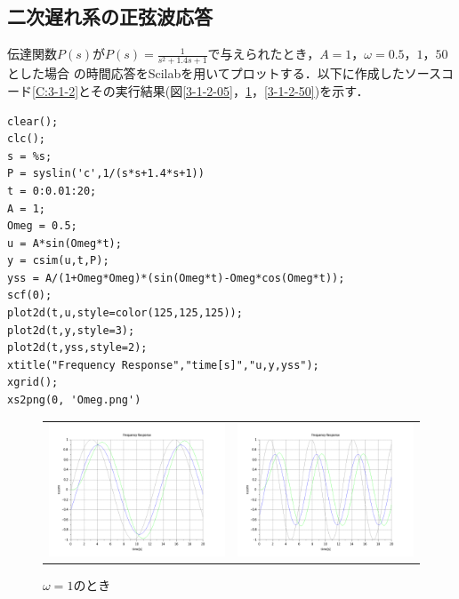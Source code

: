 \documentclass[a4paper,11pt]{jsarticle}
\begin{document}
  \subsection{二次遅れ系の正弦波応答}
    伝達関数$P(s)$が$P(s) = \frac{1}{s^2+1.4s+1}$で与えられたとき，$A=1$，$\omega = 0.5$，$1$，$50$とした場合
    の時間応答をScilabを用いてプロットする．以下に作成したソースコード\ref{C:3-1-2}とその実行結果(図\ref{3-1-2-05}，\ref{3-1-2-1}，\ref{3-1-2-50})を示す．
    \begin{lstlisting}[caption=二次遅れ系の正弦波応答, label=C:3-1-2]
clear();
clc();
s = %s;
P = syslin('c',1/(s*s+1.4*s+1))
t = 0:0.01:20;
A = 1;
Omeg = 0.5;
u = A*sin(Omeg*t);
y = csim(u,t,P);
yss = A/(1+Omeg*Omeg)*(sin(Omeg*t)-Omeg*cos(Omeg*t));
scf(0);
plot2d(t,u,style=color(125,125,125));
plot2d(t,y,style=3);
plot2d(t,yss,style=2);
xtitle("Frequency Response","time[s]","u,y,yss");
xgrid();
xs2png(0, 'Omeg.png')
    \end{lstlisting}
    \begin{figure}[H]
      \begin{tabular}{cc}
        \begin{minipage}[t]{0.48\textwidth}
          \centering
          \includegraphics[clip,width=9cm]{picture/3-1-2-05.png}
          \caption{$\omega = 0.5$のとき}
          \label{3-1-2-05}
        \end{minipage} &
        \begin{minipage}[t]{0.48\textwidth}
          \centering
          \includegraphics[clip,width=9cm]{picture/3-1-2-1.png}
          \caption{$\omega = 1$のとき}
          \label{3-1-2-1}
        \end{minipage}
      \end{tabular}
    \end{figure}
\end{document}
